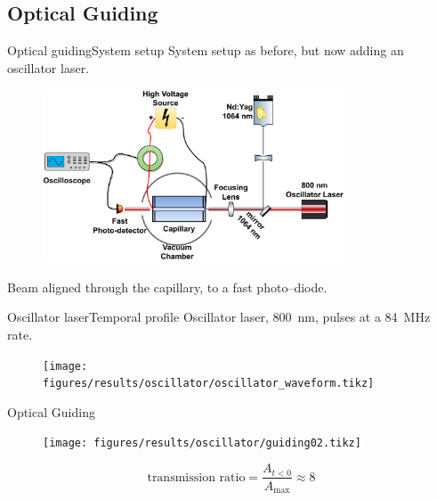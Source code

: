\documentclass[dvipsnames]{beamer}
\begin{document}
\subsection{Optical Guiding}
 \begin{frame}{Optical guiding}{System setup}
System setup as before, but now adding an oscillator laser.
\begin{figure}
 \includegraphics[width=0.8\textwidth]{figures/results/oscillator/oscillator_system_setup.pdf} 
\end{figure}
Beam aligned through the capillary, to a fast photo--diode.
 \end{frame}
 \begin{frame}{Oscillator laser}{Temporal profile}
Oscillator laser, \SI{800}{\nm}, pulses at a \SI{84}{\MHz} rate.
\begin{figure}
  \texttt{[image: figures/results/oscillator/oscillator\_waveform.tikz]}
\end{figure}
 \end{frame}
\begin{frame}{Optical Guiding}
\begin{figure}
  \texttt{[image: figures/results/oscillator/guiding02.tikz]}
\end{figure}
\begin{equation*}
\text{transmission ratio} = \frac{A_{t<0}}{A_\text{max}} \approx 8
\end{equation*}
\end{frame}
\end{document}
